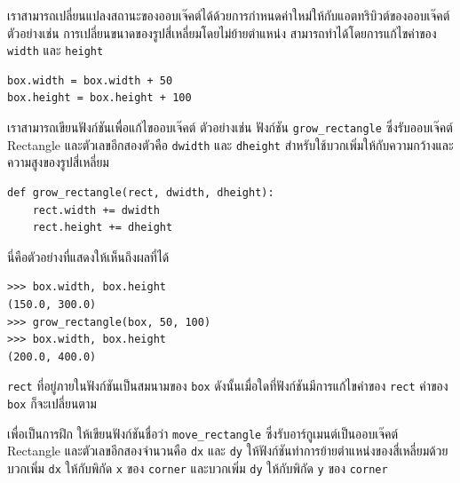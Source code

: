 
เราสามารถเปลี่ยนแปลงสถานะของออบเจ๊คต์ได้ด้วยการกำหนดค่าใหม่ให้กับแอตทริบิวต์ของออบเจ๊คต์
ตัวอย่างเช่น การเปลี่ยนขนาดของรูปสี่เหลี่ยมโดยไม่ย้ายตำแหน่ง สามารถทำได้โดยการแก้ไขค่าของ {\tt width} และ {\tt height}

\begin{verbatim}
box.width = box.width + 50
box.height = box.height + 100
\end{verbatim}
%

เราสามารถเขียนฟังก์ชันเพื่อแก้ไขออบเจ๊คต์ ตัวอย่างเช่น ฟังก์ชัน \verb"grow_rectangle" 
ซึ่งรับออบเจ๊คต์ Rectangle และตัวเลขอีกสองตัวคือ {\tt dwidth} และ {\tt dheight} สำหรับใช้บวกเพิ่มให้กับความกว้างและความสูงของรูปสี่เหลี่ยม


\begin{verbatim}
def grow_rectangle(rect, dwidth, dheight):
    rect.width += dwidth
    rect.height += dheight
\end{verbatim}
%
นี่คือตัวอย่างที่แสดงให้เห็นถึงผลที่ได้

\begin{verbatim}
>>> box.width, box.height
(150.0, 300.0)
>>> grow_rectangle(box, 50, 100)
>>> box.width, box.height
(200.0, 400.0)
\end{verbatim}
%

{\tt rect} ที่อยู่ภายในฟังก์ชันเป็นสมนามของ {\tt box} ดังนั้นเมื่อใดที่ฟังก์ชันมีการแก้ไขค่าของ {\tt rect} ค่าของ {\tt box} ก็จะเปลี่ยนตาม


เพื่อเป็นการฝึก ให้เขียนฟังก์ชันชื่อว่า \verb"move_rectangle" ซึ่งรับอาร์กูเมนต์เป็นออบเจ๊คต์ Rectangle 
และตัวเลขอีกสองจำนวนคือ {\tt dx} และ {\tt dy} ให้ฟังก์ชันทำการย้ายตำแหน่งของสี่เหลี่ยมด้วยบวกเพิ่ม 
{\tt dx} ให้กับพิกัด {\tt x} ของ {\tt corner} และบวกเพิ่ม {\tt dy} ให้กับพิกัด {\tt y} ของ {\tt corner}


